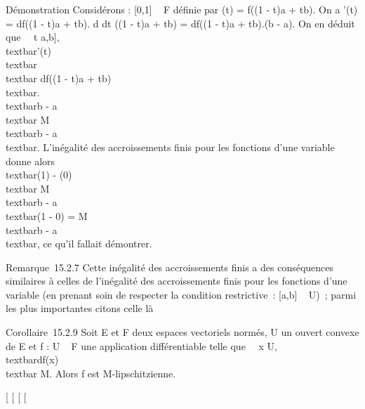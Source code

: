 \documentclass[]{article}
\begin{document}
Démonstration Considérons \phi : {[}0,1{]} \rightarrow~ F définie par \phi(t) = f((1 -
t)a + tb). On a \phi'(t) = df((1 - t)a + tb). d \over dt
((1 - t)a + tb) = df((1 - t)a + tb).(b - a). On en déduit que
\forall~~t \in {[}a,b{]},
\\textbar{}\phi'(t)\\textbar{}
\leq\\textbar{} df((1 - t)a +
tb)\\textbar{}.\\textbar{}b -
a\\textbar{} \leq M\\textbar{}b -
a\\textbar{}. L'inégalité des accroissements finis pour
les fonctions d'une variable donne alors \\textbar{}\phi(1)
- \phi(0)\\textbar{} \leq M\\textbar{}b -
a\\textbar{}(1 - 0) = M\\textbar{}b -
a\\textbar{}, ce qu'il fallait démontrer.

Remarque~15.2.7 Cette inégalité des accroissements finis a des
conséquences similaires à celles de l'inégalité des accroissements finis
pour les fonctions d'une variable (en prenant soin de respecter la
condition restrictive~: {[}a,b{]} \subset~ U)~; parmi les plus importantes
citons celle là

Corollaire~15.2.9 Soit E et F deux espaces vectoriels normés, U un
ouvert convexe de E et f : U \rightarrow~ F une application différentiable telle
que \forall~~x \in U,
\\textbar{}df(x)\\textbar{} \leq M. Alors f
est M-lipschitzienne.

{[}
{[}
{[}
{[}
\end{document}
